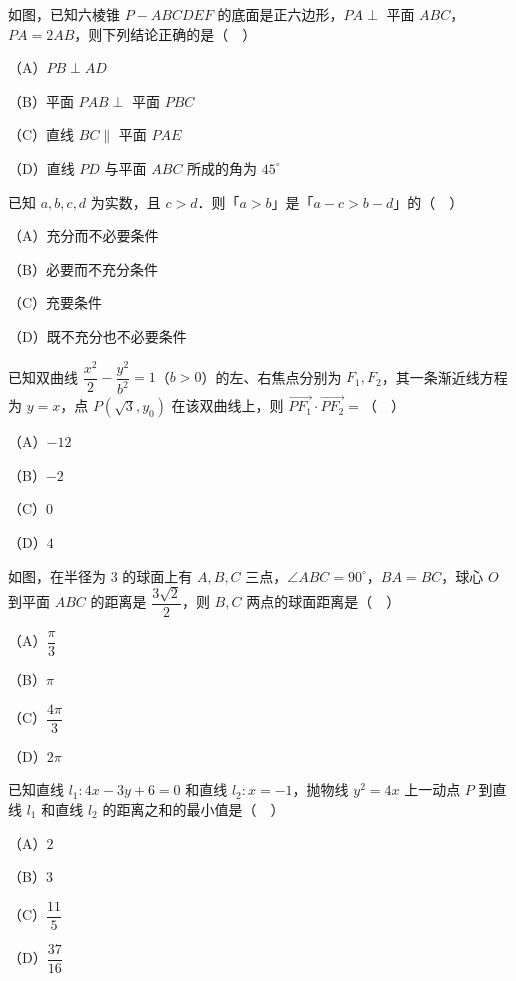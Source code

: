 \begin{question}
如图，已知六棱锥 $P-ABCDEF$ 的底面是正六边形，$PA\perp$ 平面 $ABC$，$PA=2AB$，则下列结论正确的是（　）
\nopagebreak[4]
\begin{center}\end{center}
\nopagebreak[4]
（A）$PB\perp AD$

（B）平面 $PAB\perp$ 平面 $PBC$

（C）直线 $BC\parallel$ 平面 $PAE$

（D）直线 $PD$ 与平面 $ABC$ 所成的角为 $45^\circ$

\end{question}
\begin{question}
已知 $a,b,c,d$ 为实数，且 $c>d$．则「$a>b$」是「$a-c>b-d$」的（　）

（A）充分而不必要条件

（B）必要而不充分条件

（C）充要条件

（D）既不充分也不必要条件

\end{question}
\begin{question}
已知双曲线 $\dfrac{x^2}{2}-\dfrac{y^2}{b^2}=1$（$b>0$）的左、右焦点分别为 $F_1,F_2$，其一条渐近线方程为 $y=x$，点 $P(\sqrt3,y_0)$ 在该双曲线上，则 $\overrightarrow{PF_1}\cdot\overrightarrow{PF_2}=$（　）

（A）$-12$

（B）$-2$

（C）$0$

（D）$4$

\Needspace{0.4\textheight}
\end{question}
\begin{question}
如图，在半径为 $3$ 的球面上有 $A,B,C$ 三点，$\angle ABC=90^\circ$，$BA=BC$，球心 $O$ 到平面 $ABC$ 的距离是 $\dfrac{3\sqrt2}{2}$，则 $B,C$ 两点的球面距离是（　）
\nopagebreak[4]
\begin{center}\end{center}
\nopagebreak[4]
（A）$\dfrac{\pi}{3}$

（B）$\pi$

（C）$\dfrac{4\pi}{3}$

（D）$2\pi$

\end{question}
\begin{question}
已知直线 $l_1:4x-3y+6=0$ 和直线 $l_2:x=-1$，抛物线 $y^2=4x$ 上一动点 $P$ 到直线 $l_1$ 和直线 $l_2$ 的距离之和的最小值是（　）

（A）$2$

（B）$3$

（C）$\dfrac{11}{5}$

（D）$\dfrac{37}{16}$

\end{question}
